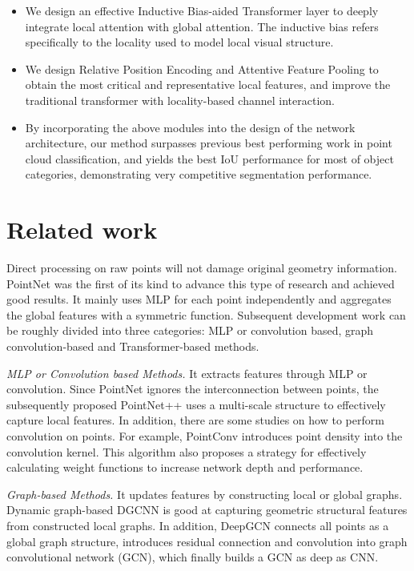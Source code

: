 \documentclass[conference]{IEEEtran}
\begin{document}
\begin{itemize}
    \item We design an effective Inductive Bias-aided Transformer layer to deeply integrate local attention with global attention. The inductive bias refers specifically to the locality used to model local visual structure. 

    \item We design Relative Position Encoding and Attentive Feature Pooling to obtain the most critical and representative local features, and improve the traditional transformer with locality-based channel interaction.
 
    \item By incorporating the above modules into the design of the network architecture, our method surpasses previous best performing work in point cloud classification, and yields the best IoU performance for most of object categories, demonstrating very competitive segmentation performance. 
\end{itemize}



\section{Related work}
Direct processing on raw points will not damage original geometry information. PointNet \cite{qi2017pointnet} was the first of its kind to advance this type of research and achieved good results. It mainly uses MLP for each point independently and aggregates the global features with a symmetric function. Subsequent development work can be roughly divided into three categories: MLP or convolution based, graph convolution-based and Transformer-based methods.

\emph{MLP or Convolution based Methods.} It extracts features through MLP or convolution. Since PointNet \cite{qi2017pointnet} ignores the interconnection between points, the subsequently proposed PointNet++ \cite{qi2017pointnet++} uses a multi-scale structure to effectively capture local features. In addition, there are some studies on how to perform convolution on points. For example, PointConv \cite{wu2019pointconv} introduces point density into the convolution kernel. This algorithm also proposes a strategy for effectively calculating weight functions to increase network depth and performance.

\emph{Graph-based Methods.} It updates features by constructing local or global graphs. Dynamic graph-based DGCNN \cite{wang2019dynamic} is good at capturing geometric structural features from constructed local graphs. In addition, DeepGCN \cite{li2019deepgcns} connects all points as a global graph structure, introduces residual connection and convolution into graph convolutional network (GCN), which finally builds a GCN as deep as CNN.
\end{document}
